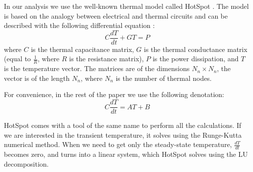In our analysis we use the well-known thermal model called HotSpot \cite{huang2006}. The model is based on the analogy between electrical and thermal circuits and can be described with the following differential equation \cite{rao2008}:
\[
  C \frac{dT}{dt} + G T = P
\]
where $C$ is the thermal capacitance matrix, $G$ is the thermal conductance matrix (equal to $\frac{1}{R}$, where $R$ is the resistance matrix), $P$ is the power dissipation, and $T$ is the temperature vector. The matrices are of the dimensions $N_n \times N_n$, the vector is of the length $N_n$, where $N_n$ is the number of thermal nodes.

For convenience, in the rest of the paper we use the following denotation:
\begin{equation} \label{eq:initial}
  C \frac{dT}{dt} = A T + B
\end{equation}

HotSpot comes with a tool of the same name to perform all the calculations. If we are interested in the transient temperature, it solves  using the Runge-Kutta numerical method. When we need to get only the steady-state temperature, $\frac{dT}{dt}$ becomes zero, and  turns into a linear system, which HotSpot solves using the LU decomposition.
